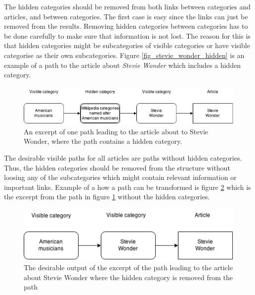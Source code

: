 The hidden categories should be removed from both links between categories and articles, and between categories. The first case is easy since the links can just be removed from the results. Removing hidden categories between categories has to be done carefully to make sure that information is not lost. The reason for this is that hidden categories might be subcategories of visible categories or have visible categorise as their own subcategories. Figure \ref{fig_stevie_wonder_hidden} is an example of a path to the article about \emph{Stevie Wonder} which includes a hidden category. 






\begin{figure}[h]
\centering
\includegraphics[width=\textwidth]{Chapters/Implementation/HiddenCategories/Stevie_wonder_hidden}
\caption[Example path with hidden category]{An excerpt of one path leading to the article about to Stevie Wonder, where the path contains a hidden category. }
\label{fig:stevie_wonder_hidden}
\end{figure}

The desirable visible paths for all articles are paths without hidden categories. Thus, the hidden categories should be removed from the structure without loosing any of the subcategories which might contain relevant information or  important links. Example of a how a path can be transformed is figure \ref{fig:stevie_wonder} which is the excerpt from the path in figure \ref{fig:stevie_wonder_hidden} without the hidden categories. 

\begin{figure}[h]
\centering
\includegraphics[width=.7\textwidth]{Chapters/Implementation/HiddenCategories/Stevie_wonder}
\caption[Example path without hidden category]{The desirable output of the excerpt of the path leading to the article about Stevie Wonder where the hidden category is removed from the path}
\label{fig:stevie_wonder}
\end{figure}

